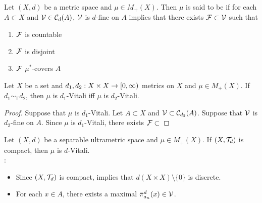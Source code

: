 \documentclass{book}
\begin{document}
	\begin{defn} 
		Let $(X, d)$ be a metric space and $\mu \in M_+(X)$. Then $\mu$ is said to be  if for each $A \subset X$ and $\mathcal{V} \in \mathcal{C}_d(A)$, $\mathcal{V}$ is $d$-fine on $A$ implies that there exists $\mathcal{F} \subset \mathcal{V}$ such that 
		\begin{enumerate}
			\item $\mathcal{F}$ is countable
			\item $\mathcal{F}$ is disjoint
			\item $\mathcal{F}$ $\mu^*$-covers $A$ 
		\end{enumerate}
	\end{defn}
	
	\begin{ex}
		Let $X$ be a set and $d_1,d_2:X \times X \rightarrow [0,\infty)$ metrics on $X$ and $\mu \in M_+(X)$. If $d_1 \sim_{\Top} d_2$, then $\mu$ is $d_1$-Vitali iff $\mu$ is $d_2$-Vitali.
	\end{ex}
	
	\begin{proof}
		Suppose that $\mu$ is $d_1$-Vitali. Let $A \subset X$ and $\mathcal{V} \subset \mathcal{C}_{d_2}(A)$. Suppose that $\mathcal{V}$ is $d_2$-fine on $A$. Since $\mu$ is $d_1$-Vitali, there exists $\mathcal{F} \subset $ 
	\end{proof}
	
	\begin{note}
	\end{note}
	
	\begin{ex} 
		Let $(X, d)$ be a separable ultrametric space and $\mu \in M_+(X)$. If $(X, \mathcal{T}_d)$ is compact, then $\mu$ is $d$-Vitali. \\
		: 
		\begin{itemize}
			\item Since $(X, \mathcal{T}_d)$ is compact,  implies that $d(X \times X) \setminus \{0\}$ is discrete. 
			\item For each $x \in A$, there exists a maximal $\bar{\pi}^{d}_{a_n}(x) \in \mathcal{V}$.
		\end{itemize}
	\end{ex}
	
\end{document}
